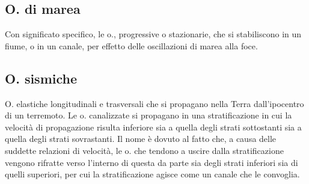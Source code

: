 \documentclass[a4paper]{article}
\begin{document}
\subsection{O. di marea}
Con significato specifico, le o., progressive o stazionarie, che si stabiliscono in un fiume, o in un canale, per effetto delle oscillazioni di marea alla foce. 

\subsection{O. sismiche}
O. elastiche longitudinali e trasversali che si propagano nella Terra dall'ipocentro di un terremoto. Le o. canalizzate si propagano in una stratificazione in cui la velocità di propagazione risulta inferiore sia a quella degli strati sottostanti sia a quella degli strati sovrastanti. Il nome è dovuto al fatto che, a causa delle suddette relazioni di velocità, le o. che tendono a uscire dalla stratificazione vengono rifratte verso l'interno di questa da parte sia degli strati inferiori sia di quelli superiori, per cui la stratificazione agisce come un canale che le convoglia. 
\end{document}
